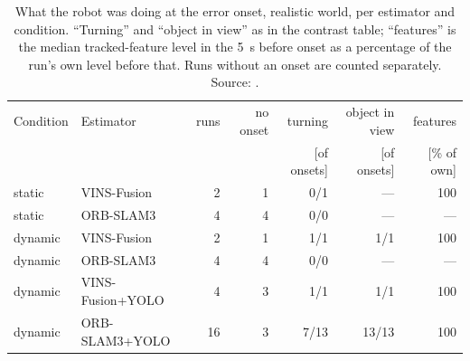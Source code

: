\begin{table}[htbp]
\centering
\small
\caption[What the robot was doing at the onset, realistic world.]{What the robot was doing at the error onset, realistic world, per estimator and condition. ``Turning'' and ``object in view'' as in the contrast table; ``features'' is the median tracked-feature level in the \SI{5}{\second} before onset as a percentage of the run's own level before that. Runs without an onset are counted separately. Source: .}
\label{tab:insight-onset-realistic}
\begin{tabular}{llrrrrr}
\toprule
Condition & Estimator & runs & no onset & turning & object in view & features \\
 & & & & [of onsets] & [of onsets] & [\si{\percent} of own] \\
\midrule
static & VINS-Fusion & 2 & 1 & 0/1 & --- & 100 \\
static & ORB-SLAM3 & 4 & 4 & 0/0 & --- & --- \\
dynamic & VINS-Fusion & 2 & 1 & 1/1 & 1/1 & 100 \\
dynamic & ORB-SLAM3 & 4 & 4 & 0/0 & --- & --- \\
dynamic & VINS-Fusion+YOLO & 4 & 3 & 1/1 & 1/1 & 100 \\
dynamic & ORB-SLAM3+YOLO & 16 & 3 & 7/13 & 13/13 & 100 \\
\bottomrule
\end{tabular}
\end{table}
